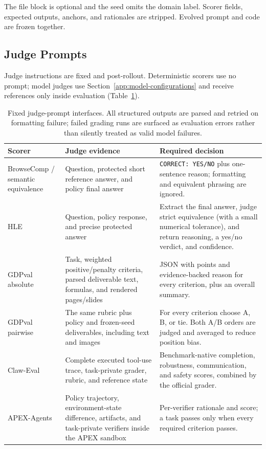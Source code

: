 The file block is optional and the seed omits the domain label.  Scorer fields,
expected outputs, anchors, and rationales are stripped.  Evolved prompt and code
are frozen together.

\subsection{Judge Prompts}
\label{app:judge-prompts}

Judge instructions are fixed and post-rollout.  Deterministic scorers use no
prompt; model judges use Section~\ref{app:model-configurations} and receive
references only inside evaluation (Table~\ref{tab:judge-prompt-design}).

\begin{table}[htbp]
\centering
\small
\caption{Fixed judge-prompt interfaces.  All structured outputs are parsed and
retried on formatting failure; failed grading runs are surfaced as evaluation
errors rather than silently treated as valid model failures.}
\label{tab:judge-prompt-design}
\begin{tabularx}{\textwidth}{p{} p{} X}
\toprule
\textbf{Scorer} & \textbf{Judge evidence} & \textbf{Required decision} \\
\midrule
BrowseComp / semantic equivalence & Question, protected short reference answer,
and policy final answer & \texttt{CORRECT: YES/NO} plus one-sentence reason;
formatting and equivalent phrasing are ignored. \\

HLE & Question, policy response, and precise protected answer & Extract the
final answer, judge strict equivalence (with a small numerical tolerance), and
return reasoning, a yes/no verdict, and confidence. \\

GDPval absolute & Task, weighted positive/penalty criteria, parsed deliverable
text, formulas, and rendered pages/slides & JSON with points and evidence-backed
reason for every criterion, plus an overall summary. \\

GDPval pairwise & The same rubric plus policy and frozen-seed deliverables,
including text and images & For every criterion choose A, B, or tie.  Both A/B
orders are judged and averaged to reduce position bias. \\

Claw-Eval & Complete executed tool-use trace, task-private grader, rubric, and
reference state & Benchmark-native completion, robustness, communication, and
safety scores, combined by the official grader. \\

APEX-Agents & Policy trajectory, environment-state difference, artifacts, and
task-private verifiers inside the APEX sandbox & Per-verifier rationale and
score; a task passes only when every required criterion passes. \\
\bottomrule
\end{tabularx}
\end{table}

